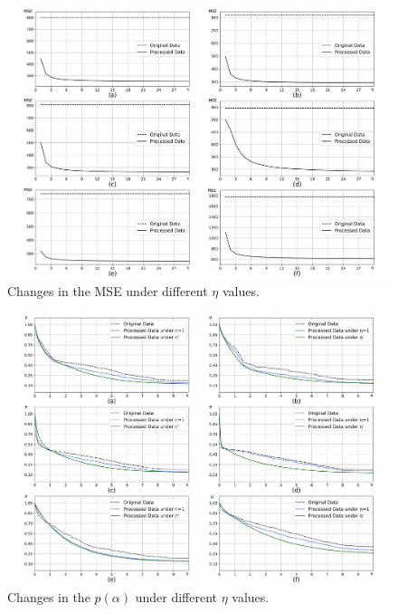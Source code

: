 \documentclass[sn-mathphys,Numbered]{sn-jnl}%
\theoremstyle{thmstyleone}%
\theoremstyle{thmstyletwo}%
\theoremstyle{thmstylethree}%
\begin{document}
\begin{figure}[H]%
\centering
\vspace{-1.0cm}   %
\setlength{\abovecaptionskip}{0.cm} %
\setlength{\abovecaptionskip}{-0.2cm} %
\includegraphics[width=1\textwidth]{fig5.pdf}
\caption{Changes in the MSE under different $\eta$ values.}\label{fig5}
\end{figure}

\begin{figure}[H]%
\centering
\vspace{-1.0cm}   %
\setlength{\abovecaptionskip}{0.cm} %
\setlength{\abovecaptionskip}{-0.2cm} %
\includegraphics[width=1\textwidth]{fig6.pdf}
\caption{Changes in the $p(\alpha)$ under different $\eta$ values.}\label{fig6}
\end{figure}
\end{document}
